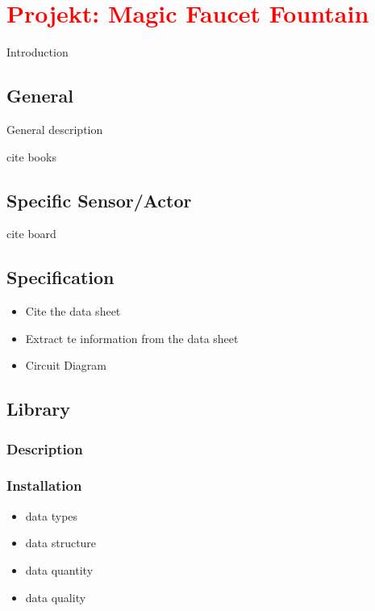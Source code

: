 %
%

\chapter{\textcolor{red}{Projekt: Magic Faucet Fountain}}

Introduction

\section{General}

General description

cite books

\section{Specific Sensor/Actor}

cite board

\section{Specification}

\begin{itemize}
  \item Cite the data sheet
  \item Extract te information from the data sheet
  \item Circuit Diagram
\end{itemize}

\section{Library}

\subsection{Description}

\subsection{Installation}

\begin{itemize}
    \item data types
    \item data structure
    \item data quantity
    \item data quality
\end{itemize}

